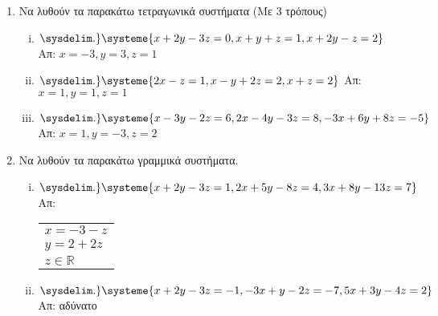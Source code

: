 


\usepackage{systeme}

\pagestyle{askhseis}


\setlength{\itemsep}{\baselineskip}


\begin{center}
\end{center}

\vspace{\baselineskip}


\begin{enumerate}
  \item Να λυθούν τα παρακάτω τετραγωνικά συστήματα (Με 3 τρόπους)

    \begin{enumerate}[i)]
      \item $ 
      \sysdelim.\}
      \systeme{x + 2y - 3z = 0,
        x + y + z =1,
      x + 2y - z = 2} $ 
      \hfill Απ: $ x=-3, y=3, z=1 $ 

    \item $ 
    \sysdelim.\}
    \systeme{2x-z=1,x-y+2z=2,x+z=2} $ 
    \hfill Απ: $ x=1, y=1, z=1 $ 

  \item $ 
  \sysdelim.\}
  \systeme{
    x-3y-2z=6,
    2x-4y-3z=8,
    -3x+6y+8z=-5
  } $ 
  \hfill Απ: $ x=1, y=-3, z=2 $ 

\end{enumerate}

\item Να λυθούν τα παρακάτω γραμμικά συστήματα.

  \begin{enumerate}[i)]
    \item $ 
    \sysdelim.\}
    \systeme{
      x+2y-3z=1,
      2x+5y-8z=4,
      3x+8y-13z=7
    } $ 
    \hfill Απ: \begin{tabular}{l}  
      $x=-3-z $ \\ 
      $ y=2+2z $ \\
      $z \in \mathbb{R}  $
    \end{tabular}

  \item $ 
  \sysdelim.\}
  \systeme{
    x+2y-3z=-1,
    -3x+y-2z=-7,
    5x+3y-4z=2
  } $ 
  \hfill Απ: αδύνατο 
\end{enumerate}


\end{enumerate}
